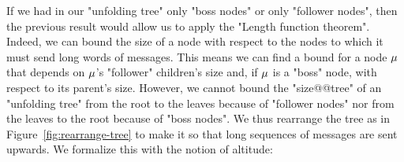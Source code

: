 
If we had in our "unfolding tree" only "boss nodes" or only "follower nodes", then the previous result would allow us to apply the "Length function theorem". Indeed, we can bound the size of a node with respect to the nodes to which it must send long words of messages. This means we can find a bound for a node $\mu$ that depends on $\mu$'s "follower" children's size and, if $\mu$ is a "boss" node, with respect to its parent's size. However, we cannot bound the "size@@tree" of an "unfolding tree" from the root to the leaves because of "follower nodes" nor from the leaves to the root because of "boss nodes". We thus rearrange the tree as in Figure~\ref{fig:rearrange-tree} to make it so that long sequences of messages are sent upwards. We formalize this with the notion of altitude:

